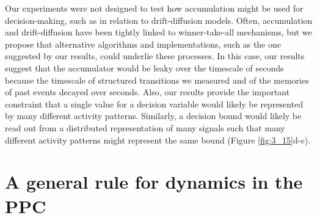 \bigskip
Our experiments were not designed to test how accumulation might be used for decision-making, such as in relation to drift-diffusion models. Often, accumulation and drift-diffusion have been tightly linked to winner-take-all mechanisms, but we propose that alternative algorithms and implementations, such as the one suggested by our results, could underlie these processes. In this case, our results suggest that the accumulator would be leaky over the timescale of seconds because the timescale of structured transitions we measured and of the memories of past events decayed over seconds. Also, our results provide the important constraint that a single value for a decision variable would likely be represented by many different activity patterns. Similarly, a decision bound would likely be read out from a distributed representation of many signals such that many different activity patterns might represent the same bound (Figure \ref{fig:3_15}d-e).

\section{A general rule for dynamics in the PPC} \label{discussion:model}

